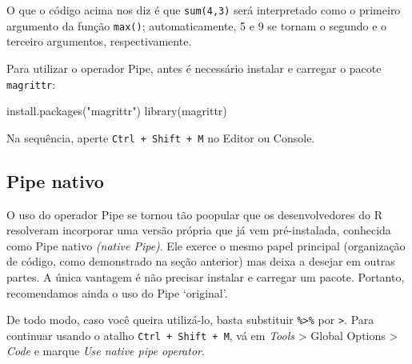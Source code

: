 \documentclass[
  letterpaper,
  DIV=11,
  numbers=noendperiod]{scrreprt}
\newenvironment{Shaded}{\begin{snugshade}}{\end{snugshade}}
\newcommand{\FunctionTok}[1]{\textcolor[rgb]{0.28,0.35,0.67}{#1}}
\newcommand{\NormalTok}[1]{\textcolor[rgb]{0.00,0.23,0.31}{#1}}
\newcommand{\StringTok}[1]{\textcolor[rgb]{0.13,0.47,0.30}{#1}}
\begin{document}
O que o código acima nos diz é que \texttt{sum(4,3)} será interpretado
como o primeiro argumento da função \texttt{max()}; automaticamente, 5 e
9 se tornam o segundo e o terceiro argumentos, respectivamente.

Para utilizar o operador Pipe, antes é necessário instalar e carregar o
pacote \texttt{magrittr}:

\begin{Shaded}
\begin{Highlighting}[]
\FunctionTok{install.packages}\NormalTok{(}\StringTok{"magrittr"}\NormalTok{)}
\FunctionTok{library}\NormalTok{(magrittr)}
\end{Highlighting}
\end{Shaded}

Na sequência, aperte \texttt{Ctrl\ +\ Shift\ +\ M} no Editor ou Console.

\subsection{Pipe nativo}\label{pipe-nativo}

O uso do operador Pipe se tornou tão poopular que os desenvolvedores do
R resolveram incorporar uma versão própria que já vem pré-instalada,
conhecida como Pipe nativo \emph{(native Pipe)}. Ele exerce o mesmo
papel principal (organização de código, como demonstrado na seção
anterior) mas deixa a desejar em outras partes. A única vantagem é não
precisar instalar e carregar um pacote. Portanto, recomendamos ainda o
uso do Pipe `original'.

De todo modo, caso você queira utilizá-lo, basta substituir
\texttt{\%\textgreater{}\%} por \texttt{\textbar{}\textgreater{}}. Para
continuar usando o atalho \texttt{Ctrl\ +\ Shift\ +\ M}, vá em
\emph{Tools} \textgreater{} Global Options \textgreater{} \emph{Code} e
marque \emph{Use native pipe operator}.
\end{document}
